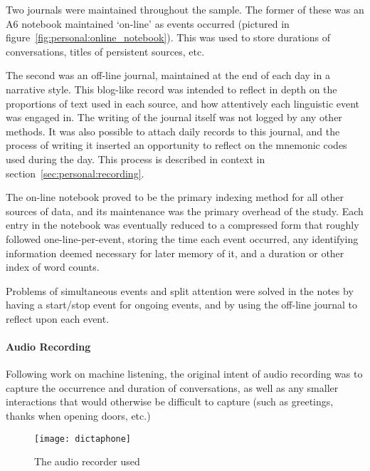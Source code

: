 Two journals were maintained throughout the sample.  The former of these was an A6 notebook maintained `on-line' as events occurred (pictured in figure~\ref{fig:personal:online_notebook}).  This was used to store durations of conversations, titles of persistent sources, etc.

The second was an off-line journal, maintained at the end of each day in a narrative style.  This blog-like record was intended to reflect in depth on the proportions of text used in each source, and how attentively each linguistic event was engaged in.  The writing of the journal itself was not logged by any other methods.  It was also possible to attach daily records to this journal, and the process of writing it inserted an opportunity to reflect on the mnemonic codes used during the day.  This process is described in context in section~\ref{sec:personal:recording}.

The on-line notebook proved to be the primary indexing method for all other sources of data, and its maintenance was the primary overhead of the study.  Each entry in the notebook was eventually reduced to a compressed form that roughly followed one-line-per-event, storing the time each event occurred, any identifying information deemed necessary for later memory of it, and a duration or other index of word counts.


Problems of simultaneous events and split attention were solved in the notes by having a start/stop event for ongoing events, and by using the off-line journal to reflect upon each event.


\paragraph{Audio Recording}
Following work on machine listening, the original intent of audio recording was to capture the occurrence and duration of conversations, as well as any smaller interactions that would otherwise be difficult to capture (such as greetings, thanks when opening doors, etc.)


\begin{figure}[p]
\centering
\texttt{[image: dictaphone]}
\caption{The audio recorder used}
\label{fig:personal:audiorecorder}
\end{figure}



